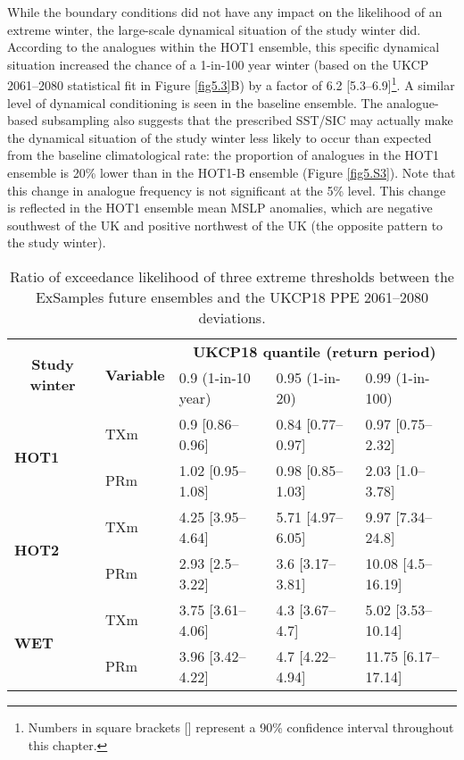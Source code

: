       While the boundary conditions did not have any impact on the likelihood of an extreme winter, the large-scale dynamical situation of the study winter did. According to the analogues within the HOT1 ensemble, this specific dynamical situation increased the chance of a 1-in-100 year winter (based on the UKCP 2061--2080 statistical fit in Figure \ref{fig5.3}B) by a factor of 6.2 [5.3--6.9]\footnote{Numbers in square brackets [] represent a 90\% confidence interval throughout this chapter.}. A similar level of dynamical conditioning is seen in the baseline ensemble. The analogue-based subsampling also suggests that the prescribed SST/SIC may actually make the dynamical situation of the study winter less likely to occur than expected from the baseline climatological rate: the proportion of analogues in the HOT1 ensemble is 20\% lower than in the HOT1-B ensemble (Figure \ref{fig5.S3}). Note that this change in analogue frequency is not significant at the 5\% level. This change is reflected in the HOT1 ensemble mean MSLP anomalies, which are negative southwest of the UK and positive northwest of the UK (the opposite pattern to the study winter).

      \begin{table}[h]
        \centering
        \footnotesize
        \begin{tabular}{lllll}
          \toprule
          \multicolumn{1}{c}{\multirow{2}{*}{\textbf{Study winter}}}&\multicolumn{1}{c}{\multirow{2}{*}{\textbf{Variable}}}&\multicolumn{3}{c}{\textbf{UKCP18 quantile (return period)}}\\\cmidrule(lr){3-5}
          \multicolumn{1}{c}{}&\multicolumn{1}{c}{}&\multicolumn{1}{l}{0.9 (1-in-10 year)}&\multicolumn{1}{l}{0.95 (1-in-20)}&0.99 (1-in-100)\\\midrule
          \multirow{2}{*}{\textbf{HOT1}}&TXm&\multicolumn{1}{l}{0.9 {[}0.86--0.96{]}}&\multicolumn{1}{l}{0.84 {[}0.77--0.97{]}}&0.97 {[}0.75--2.32{]}\\
          &PRm&\multicolumn{1}{l}{1.02 {[}0.95--1.08{]}}&\multicolumn{1}{l}{0.98 {[}0.85--1.03{]}}&2.03 {[}1.0--3.78{]}\\\midrule
          \multirow{2}{*}{\textbf{HOT2}}&TXm&\multicolumn{1}{l}{4.25 {[}3.95--4.64{]}}&\multicolumn{1}{l}{5.71 {[}4.97--6.05{]}}&9.97 {[}7.34--24.8{]}\\
          &PRm&\multicolumn{1}{l}{2.93 {[}2.5--3.22{]}}&\multicolumn{1}{l}{3.6 {[}3.17--3.81{]}}&10.08 {[}4.5--16.19{]}\\\midrule
          \multirow{2}{*}{\textbf{WET}}&TXm&\multicolumn{1}{l}{3.75 {[}3.61--4.06{]}}&\multicolumn{1}{l}{4.3 {[}3.67--4.7{]}}&5.02 {[}3.53--10.14{]}\\
          &PRm&\multicolumn{1}{l}{3.96 {[}3.42--4.22{]}}&\multicolumn{1}{l}{4.7 {[}4.22--4.94{]}}&11.75 {[}6.17--17.14{]}\\\bottomrule
          \end{tabular}
        \caption{Ratio of exceedance likelihood of three extreme thresholds between the ExSamples future ensembles and the UKCP18 PPE 2061--2080 deviations.}
      \end{table}

